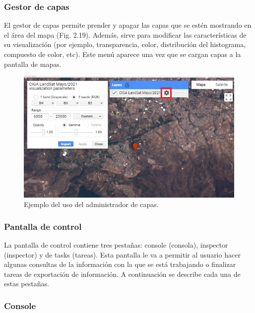 \documentclass[
  12pt,
  letterpaper,
  twoside]{book}
\begin{document}
\hypertarget{gestor-de-capas}{%
\subsubsection*{Gestor de capas}\label{gestor-de-capas}}

El gestor de capas permite prender y apagar las capas que se estén mostrando en el área del mapa (Fig. 2.19). Además, sirve para modificar las características de su visualización (por ejemplo, transparencia, color, distribución del histograma, compuesto de color, etc). Este menú aparece una vez que se cargan capas a la pantalla de mapas.

\begin{figure}[btp]

{\centering \includegraphics[width=0.8\linewidth]{Img/layer} 

}

\caption{Ejemplo del uso del administrador de capas.}\label{fig:unnamed-chunk-20}
\end{figure}

\hypertarget{pantalla-de-control}{%
\subsubsection*{Pantalla de control}\label{pantalla-de-control}}

La pantalla de control contiene tres pestañas: console (consola), inspector (inspector) y de tasks (tareas). Esta pantalla le va a permitir al usuario hacer algunas consultas de la información con la que se está trabajando o finalizar tareas de exportación de información. A continuación se describe cada una de estas pestañas.

\hypertarget{console}{%
\subsubsection*{Console}\label{console}}
\end{document}
